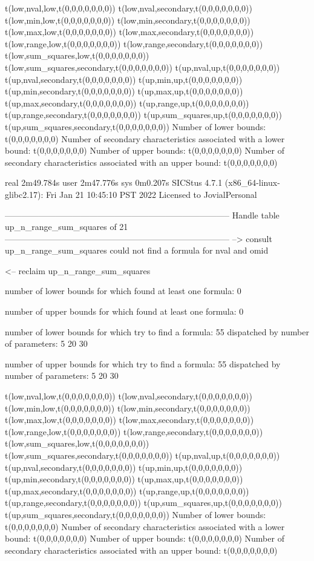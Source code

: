 t(low,nval,low,t(0,0,0,0,0,0,0))
t(low,nval,secondary,t(0,0,0,0,0,0,0))
t(low,min,low,t(0,0,0,0,0,0,0))
t(low,min,secondary,t(0,0,0,0,0,0,0))
t(low,max,low,t(0,0,0,0,0,0,0))
t(low,max,secondary,t(0,0,0,0,0,0,0))
t(low,range,low,t(0,0,0,0,0,0,0))
t(low,range,secondary,t(0,0,0,0,0,0,0))
t(low,sum_squares,low,t(0,0,0,0,0,0,0))
t(low,sum_squares,secondary,t(0,0,0,0,0,0,0))
t(up,nval,up,t(0,0,0,0,0,0,0))
t(up,nval,secondary,t(0,0,0,0,0,0,0))
t(up,min,up,t(0,0,0,0,0,0,0))
t(up,min,secondary,t(0,0,0,0,0,0,0))
t(up,max,up,t(0,0,0,0,0,0,0))
t(up,max,secondary,t(0,0,0,0,0,0,0))
t(up,range,up,t(0,0,0,0,0,0,0))
t(up,range,secondary,t(0,0,0,0,0,0,0))
t(up,sum_squares,up,t(0,0,0,0,0,0,0))
t(up,sum_squares,secondary,t(0,0,0,0,0,0,0))
Number of lower bounds:                                             t(0,0,0,0,0,0,0)
Number of secondary characteristics associated with a lower bound:  t(0,0,0,0,0,0,0)
Number of upper bounds:                                             t(0,0,0,0,0,0,0)
Number of secondary characteristics associated with an upper bound: t(0,0,0,0,0,0,0)

real	2m49.784s
user	2m47.776s
sys	0m0.207s
SICStus 4.7.1 (x86_64-linux-glibc2.17): Fri Jan 21 10:45:10 PST 2022
Licensed to JovialPersonal


--------------------------------------------------------------------------------
Handle table up_n_range_sum_squares of 21
--------------------------------------------------------------------------------
--> consult up_n_range_sum_squares
could not find a formula for nval and omid

<-- reclaim up_n_range_sum_squares

number of lower bounds for which found at least one formula: 0

number of upper bounds for which found at least one formula: 0

number of lower bounds for which try to find a formula: 55
dispatched by number of parameters: 5  20  30

number of upper bounds for which try to find a formula: 55
dispatched by number of parameters: 5  20  30

t(low,nval,low,t(0,0,0,0,0,0,0))
t(low,nval,secondary,t(0,0,0,0,0,0,0))
t(low,min,low,t(0,0,0,0,0,0,0))
t(low,min,secondary,t(0,0,0,0,0,0,0))
t(low,max,low,t(0,0,0,0,0,0,0))
t(low,max,secondary,t(0,0,0,0,0,0,0))
t(low,range,low,t(0,0,0,0,0,0,0))
t(low,range,secondary,t(0,0,0,0,0,0,0))
t(low,sum_squares,low,t(0,0,0,0,0,0,0))
t(low,sum_squares,secondary,t(0,0,0,0,0,0,0))
t(up,nval,up,t(0,0,0,0,0,0,0))
t(up,nval,secondary,t(0,0,0,0,0,0,0))
t(up,min,up,t(0,0,0,0,0,0,0))
t(up,min,secondary,t(0,0,0,0,0,0,0))
t(up,max,up,t(0,0,0,0,0,0,0))
t(up,max,secondary,t(0,0,0,0,0,0,0))
t(up,range,up,t(0,0,0,0,0,0,0))
t(up,range,secondary,t(0,0,0,0,0,0,0))
t(up,sum_squares,up,t(0,0,0,0,0,0,0))
t(up,sum_squares,secondary,t(0,0,0,0,0,0,0))
Number of lower bounds:                                             t(0,0,0,0,0,0,0)
Number of secondary characteristics associated with a lower bound:  t(0,0,0,0,0,0,0)
Number of upper bounds:                                             t(0,0,0,0,0,0,0)
Number of secondary characteristics associated with an upper bound: t(0,0,0,0,0,0,0)

